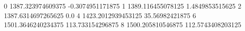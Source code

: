 0 1387.323974609375 -0.3074951171875
1 1389.116455078125 1.4849853515625
2 1387.6314697265625 0.0
4 1423.2012939453125 35.56982421875
6 1501.3646240234375 113.733154296875
8 1500.205810546875 112.5743408203125
